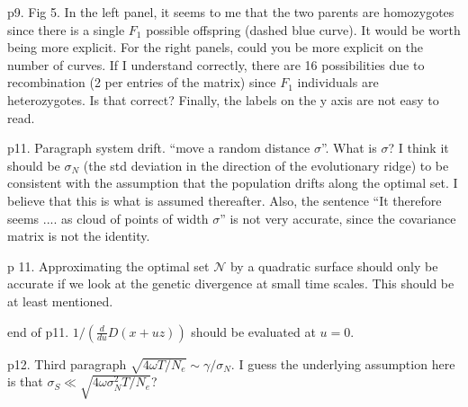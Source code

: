 
\begin{point}{p9. Fig 5.} 
    In the left panel, it seems to me that the two parents are homozygotes since there
is a single $F_1$ possible offspring (dashed blue curve). It would be worth being more explicit.
For the right panels, could you be more explicit on the number of curves. If I understand
correctly, there are 16 possibilities due to recombination (2 per entries of the matrix) since
$F_1$ individuals are heterozygotes. Is that correct?
Finally, the labels on the y axis are not easy to read.
\end{point}


\begin{point}{p11. Paragraph system drift.}
    ``move a random distance $\sigma$''. What is $\sigma$? I think it should
be $\sigma_N$ (the std deviation in the direction of the evolutionary ridge) to be consistent with
the assumption that the population drifts along the optimal set. I believe that this is what
is assumed thereafter. Also, the sentence ``It therefore seems .... as cloud of points of width
$\sigma$'' is not very accurate, since the covariance matrix is not the identity.
\end{point}


\begin{point}{p 11.}
    Approximating the optimal set $\mathcal{N}$ by a quadratic surface should only be accurate if
we look at the genetic divergence at small time scales. This should be at least mentioned.
\end{point}


\begin{point}{end of p11.}
    $1/( \frac{d}{du} D(x + uz))$ should be evaluated at $u = 0$.
\end{point}


\begin{point}{p12. Third paragraph}
    $\sqrt{4 \omega T/N_e} \sim \gamma/\sigma_N$.
    I guess the underlying assumption here is that
    $\sigma_S \ll \sqrt{4 \omega \sigma^2_N T/N_e}$?
\end{point}

